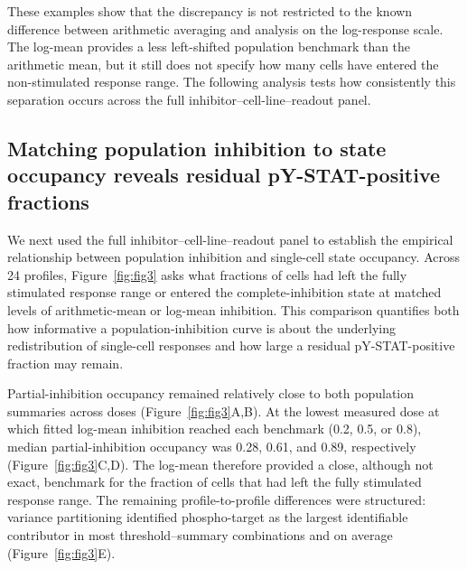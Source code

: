 \documentclass[11pt]{article}
\begin{document}
These examples show that the discrepancy is not restricted to the known difference between arithmetic averaging and analysis on the log-response scale. The log-mean provides a less left-shifted population benchmark than the arithmetic mean, but it still does not specify how many cells have entered the non-stimulated response range. The following analysis tests how consistently this separation occurs across the full inhibitor--cell-line--readout panel.

\subsection*{Matching population inhibition to state occupancy reveals residual pY-STAT-positive fractions}

We next used the full inhibitor--cell-line--readout panel to establish the empirical relationship between population inhibition and single-cell state occupancy. Across 24 profiles, Figure~\ref{fig:fig3} asks what fractions of cells had left the fully stimulated response range or entered the complete-inhibition state at matched levels of arithmetic-mean or log-mean inhibition. This comparison quantifies both how informative a population-inhibition curve is about the underlying redistribution of single-cell responses and how large a residual pY-STAT-positive fraction may remain.

Partial-inhibition occupancy remained relatively close to both population summaries across doses (Figure~\ref{fig:fig3}A,B). At the lowest measured dose at which fitted log-mean inhibition reached each benchmark (0.2, 0.5, or 0.8), median partial-inhibition occupancy was 0.28, 0.61, and 0.89, respectively (Figure~\ref{fig:fig3}C,D). The log-mean therefore provided a close, although not exact, benchmark for the fraction of cells that had left the fully stimulated response range. The remaining profile-to-profile differences were structured: variance partitioning identified phospho-target as the largest identifiable contributor in most threshold--summary combinations and on average (Figure~\ref{fig:fig3}E).
\end{document}
